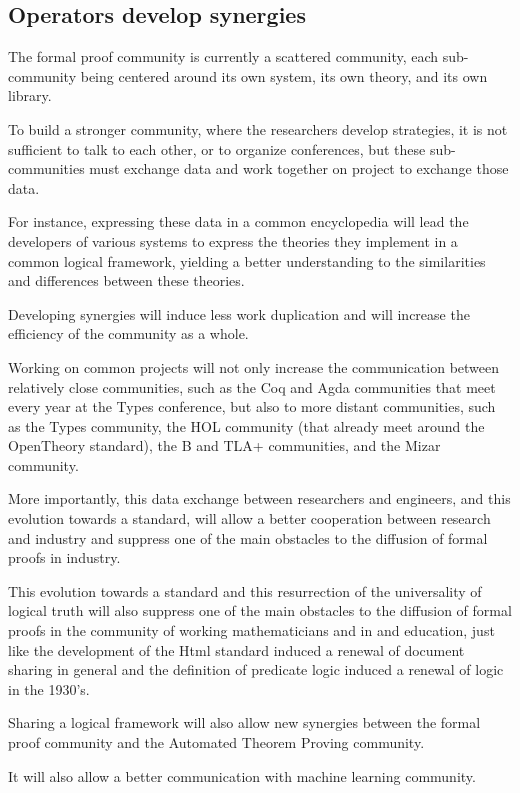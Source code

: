 \subsection{Operators develop synergies}

The formal proof community is currently a scattered community, each
sub-community being centered around its own system, its own theory,
and its own library.

To build a stronger community, where the researchers develop strategies,
it is not sufficient to talk to each other, or to organize conferences,
but these sub-communities must exchange data and work together on project to
exchange those data.

For instance, expressing these data in a common encyclopedia will
lead the developers of various systems to express the theories they
implement in a common logical framework, yielding a better understanding
to the similarities and differences between these theories.

Developing synergies will induce less work duplication and will increase
the efficiency of the community as a whole.

Working on common projects will not only increase the communication
between relatively close communities, such as the {\sf Coq} and {\sf
  Agda} communities that meet every year at the Types conference, but
also to more distant communities, such as the Types community, the HOL
community (that already meet around the {\sf OpenTheory} standard),
the {\sf B} and {\sf TLA+} communities, and the {\sf Mizar} community.

More importantly, this data exchange between researchers and
engineers, and this evolution towards a standard, will allow a better
cooperation between research and industry and suppress one of the main
obstacles to the diffusion of formal proofs in industry.

This evolution towards a standard and this resurrection of the
universality of logical truth will also suppress one of the main
obstacles to the diffusion of formal proofs in the community of
working mathematicians and in and education, just like the development
of the {\sf Html} standard induced a renewal of document sharing in general
and the definition of predicate logic induced a renewal of logic in
the 1930's.

Sharing a logical framework will also allow new synergies between 
the formal proof community and the Automated Theorem Proving community.

It will also allow a better communication with machine learning community.

